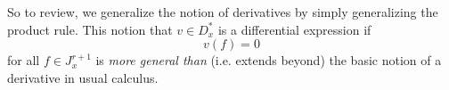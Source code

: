 So to review, we generalize the notion of derivatives by simply
generalizing the product rule. This notion that $v\in D^{*}_{x}$
is a differential expression if
\begin{equation}
v(f)=0
\end{equation}
for all $f\in J^{r+1}_{x}$ is \emph{more general than} (i.e. extends
beyond) the basic notion of a derivative in usual calculus.

